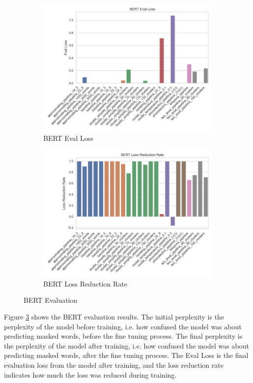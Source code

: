 \begin{figure}[H]
    \begin{subfigure}[b]{0.48\linewidth}
        \includegraphics[width=0.7\linewidth]{figures/results/bert_eval_loss.png}
        \caption{BERT Eval Loss}
        \label{fig:bert-eval-loss}
    \end{subfigure}
    \hfill
    \begin{subfigure}[b]{0.48\linewidth}
        \includegraphics[width=0.7\linewidth]{figures/results/bert_loss_reduction_rate.png}
        \caption{BERT Loss Reduction Rate}
        \label{fig:bert-loss-reduction-rate}
    \end{subfigure}
    \caption{BERT Evaluation}
    \label{fig:bert-statistics}
\end{figure}

Figure \ref{fig:bert-statistics} shows the BERT evaluation results.
The initial perplexity is the perplexity of the model before training, i.e. how confused the model was about predicting masked words, before the fine tuning process.
The final perplexity is the perplexity of the model after training, i.e. how confused the model was about predicting masked words, after the fine tuning process.
The Eval Loss is the final evaluation loss from the model after training, and the loss reduction rate indicates how much the loss was reduced during training.


